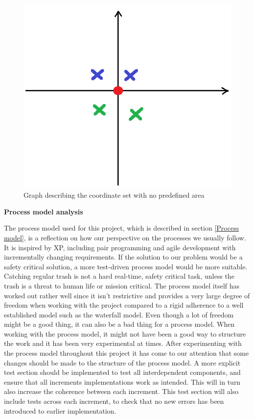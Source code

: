 \begin{figure}[h]
	\centering
	\includegraphics[scale=0.75]{billeder/discussion-graph.png}
	\caption{Graph describing the coordinate set with no predefined area}
	\label{figure:graph}
\end{figure}

\textbf{Process model analysis}

The process model used for this project, which is described in section \ref{Process model}, is a reflection on how our perspective on the processes we usually follow. It is inspired by XP, including pair programming and agile development with incrementally changing requirements. If the solution to our problem would be a safety critical solution, a more test-driven process model would be more suitable. Catching regular trash is not a hard real-time, safety critical task, unless the trash is a threat to human life or mission critical.\newline
The process model itself has worked out rather well since it isn’t restrictive and provides a very large degree of freedom when working with the project compared to a rigid adherence to a well established model such as the waterfall model. \newline
Even though a lot of freedom might be a good thing, it can also be a bad thing for a process model. When working with the process model, it might not have been a good way to structure the work and it has been very experimental at times. \newline
After experimenting with the process model throughout this project it has come to our attention that some changes should be made to the structure of the process model. A more explicit test section should be implemented to test all interdependent components, and ensure that all increments implementations work as intended. This will in turn also increase the coherence between each increment. This test section will also include tests across each increment, to check that no new errors has been introduced to earlier implementation.



